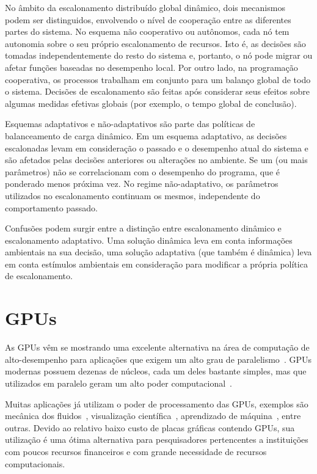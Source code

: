 No âmbito da escalonamento distribuído global dinâmico, dois mecanismos podem ser distinguidos, envolvendo o nível de cooperação entre as diferentes partes do sistema. No esquema não cooperativo ou autônomos, cada nó tem autonomia sobre o seu próprio escalonamento de recursos. Isto é, as decisões são tomadas independentemente do resto do sistema e, portanto, o nó pode migrar ou afetar funções baseadas no desempenho local. Por outro lado, na programação cooperativa, os processos trabalham em conjunto para um balanço global de todo o sistema. Decisões de escalonamento são feitas após considerar seus efeitos sobre algumas medidas efetivas globais (por exemplo, o tempo global de conclusão).

Esquemas adaptativos e não-adaptativos são parte das políticas de balanceamento de carga dinâmico. Em um esquema adaptativo, as decisões escalonadas levam em consideração o passado e o desempenho atual do sistema e são afetados pelas decisões anteriores ou alterações no ambiente. Se um (ou mais parâmetros) não se correlacionam com o desempenho do programa, que é ponderado menos próxima vez. No regime não-adaptativo, os parâmetros utilizados no escalonamento continuam os mesmos, independente do comportamento passado. 
	
Confusões podem surgir entre a distinção entre escalonamento dinâmico e escalonamento adaptativo. Uma solução dinâmica leva em conta informações ambientais na sua decisão, uma solução adaptativa (que também é dinâmica) leva em conta estímulos ambientais em consideração para modificar a própria política de escalonamento.



\section{GPUs}\label{intro:historico}

As GPUs vêm se mostrando uma excelente alternativa na área de computação de alto-desempenho para aplicações que exigem um alto grau de paralelismo~\citep{gpu}. GPUs modernas possuem dezenas de núcleos, cada um deles bastante simples, mas que utilizados em paralelo geram um alto poder computacional~\citep{cuda}.

Muitas aplicações já utilizam o poder de processamento das GPUs, exemplos são mecânica dos fluidos~\citep{fluido}, visualização científica~\citep{visualizacao},  aprendizado de máquina~\citep{Aprendizado}, entre outras. Devido ao relativo baixo custo de placas gráficas contendo GPUs, sua utilização é uma ótima alternativa para pesquisadores pertencentes a instituições com poucos recursos financeiros e com grande necessidade de recursos computacionais.


